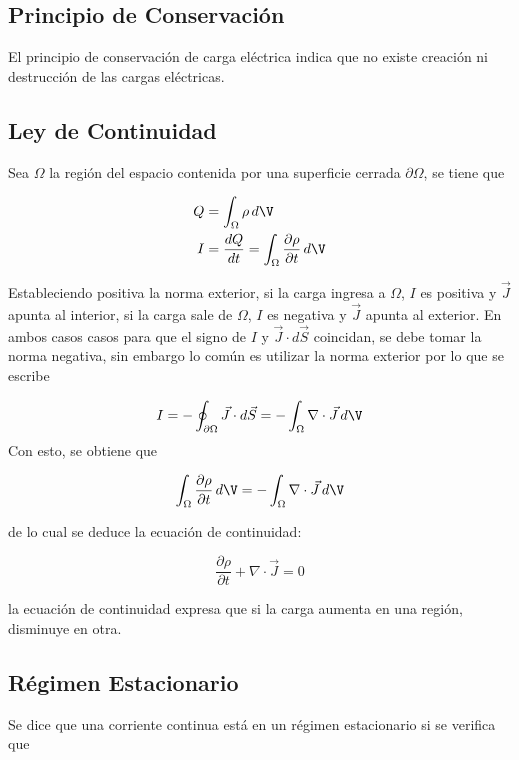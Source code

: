 \subsection{Principio de Conservación}

El principio de conservación de carga eléctrica indica que no existe creación ni destrucción de las cargas eléctricas.

\subsection{Ley de Continuidad}

Sea $\Omega$ la región del espacio contenida por una superficie cerrada $\partial\Omega$, se tiene que

\begin{equation}
\begin{split}
    Q &= \int_\Omega\rho\, d\V\\
    I &= \frac{dQ}{dt} =
    \int_\Omega\frac{\partial\rho}{\partial t}\,d\V\\
\end{split}
\nonumber
\end{equation}

Estableciendo positiva la norma exterior, si la carga ingresa a $\Omega$, $I$ es positiva y $\Vec{J}$ apunta al interior, si la carga sale de $\Omega$, $I$ es negativa y $\Vec{J}$ apunta al exterior. En ambos casos casos para que el signo de $I$ y $\Vec{J}\cdot d\Vec{S}$ coincidan, se debe tomar la norma negativa, sin embargo lo común es utilizar la norma exterior por lo que se escribe 

\[I = -\oint_{\partial\Omega}\Vec{J}\cdot d\Vec{S}=-\int_\Omega \nabla\cdot \Vec{J}\,d\V\]
\bigbreak
Con esto, se obtiene que

\[\int_\Omega\frac{\partial\rho}{\partial t}\,d\V=
-\int_\Omega \nabla\cdot \Vec{J}\,d\V\]
\bigbreak

de lo cual se deduce la ecuación de continuidad:

\[\frac{\partial\rho}{\partial t}+\nabla\cdot\Vec{J}=0\]

la ecuación de continuidad expresa que si la carga aumenta en una región, disminuye en otra.

\subsection{Régimen Estacionario}

Se dice que una corriente continua está en un régimen estacionario si se verifica que

